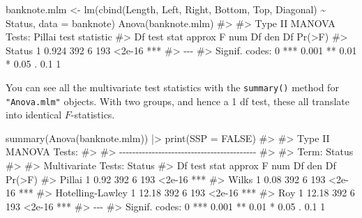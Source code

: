 \documentclass[
  letterpaper,
  10pt,
  krantz2]{krantz}
\makeatletter
\newenvironment{Shaded}{\begin{snugshade}}{\end{snugshade}}
\newcommand{\AttributeTok}[1]{\textcolor[rgb]{0.40,0.45,0.13}{#1}}
\newcommand{\CommentTok}[1]{\textcolor[rgb]{0.37,0.37,0.37}{#1}}
\newcommand{\ConstantTok}[1]{\textcolor[rgb]{0.56,0.35,0.01}{#1}}
\newcommand{\FunctionTok}[1]{\textcolor[rgb]{0.28,0.35,0.67}{#1}}
\newcommand{\NormalTok}[1]{\textcolor[rgb]{0.00,0.23,0.31}{#1}}
\newcommand{\OtherTok}[1]{\textcolor[rgb]{0.00,0.23,0.31}{#1}}
\newcommand{\SpecialCharTok}[1]{\textcolor[rgb]{0.37,0.37,0.37}{#1}}
\newenvironment{kframe}{%
  \medskip{}
  \setlength{\fboxsep}{.8em}
  \def\at@end@of@kframe{}%
  \ifinner\ifhmode%
  \def\at@end@of@kframe{\end{minipage}}%
  \begin{minipage}{\columnwidth}%
  \fi\fi%
  \def\FrameCommand##1{\hskip\@totalleftmargin \hskip-\fboxsep
  \colorbox{shadecolor}{##1}\hskip-\fboxsep
      \hskip-\linewidth \hskip-\@totalleftmargin \hskip\columnwidth}%
  \MakeFramed {\advance\hsize-\width
    \@totalleftmargin\z@ \linewidth\hsize
    \@setminipage}}%
{\par\unskip\endMakeFramed%
  \at@end@of@kframe}
\renewenvironment{Shaded}{\begin{kframe}}{\end{kframe}}
\makeatother
\begin{document}
\begin{Shaded}
\begin{Highlighting}[]
\NormalTok{banknote.mlm }\OtherTok{\textless{}{-}} \FunctionTok{lm}\NormalTok{(}\FunctionTok{cbind}\NormalTok{(Length, Left, Right, Bottom, Top, Diagonal) }\SpecialCharTok{\textasciitilde{}}\NormalTok{ Status,}
                    \AttributeTok{data =}\NormalTok{ banknote)}
\FunctionTok{Anova}\NormalTok{(banknote.mlm)}
\CommentTok{\#\textgreater{} }
\CommentTok{\#\textgreater{} Type II MANOVA Tests: Pillai test statistic}
\CommentTok{\#\textgreater{}        Df test stat approx F num Df den Df Pr(\textgreater{}F)    }
\CommentTok{\#\textgreater{} Status  1     0.924      392      6    193 \textless{}2e{-}16 ***}
\CommentTok{\#\textgreater{} {-}{-}{-}}
\CommentTok{\#\textgreater{} Signif. codes:  0 \textquotesingle{}***\textquotesingle{} 0.001 \textquotesingle{}**\textquotesingle{} 0.01 \textquotesingle{}*\textquotesingle{} 0.05 \textquotesingle{}.\textquotesingle{} 0.1 \textquotesingle{} \textquotesingle{} 1}
\end{Highlighting}
\end{Shaded}

You can see all the multivariate test statistics with the
\texttt{summary()} method for \texttt{"Anova.mlm"} objects. With two
groups, and hence a 1 df test, these all translate into identical
\(F\)-statistics.

\begin{Shaded}
\begin{Highlighting}[]
\FunctionTok{summary}\NormalTok{(}\FunctionTok{Anova}\NormalTok{(banknote.mlm)) }\SpecialCharTok{|\textgreater{}} \FunctionTok{print}\NormalTok{(}\AttributeTok{SSP =} \ConstantTok{FALSE}\NormalTok{)}
\CommentTok{\#\textgreater{} }
\CommentTok{\#\textgreater{} Type II MANOVA Tests:}
\CommentTok{\#\textgreater{} }
\CommentTok{\#\textgreater{} {-}{-}{-}{-}{-}{-}{-}{-}{-}{-}{-}{-}{-}{-}{-}{-}{-}{-}{-}{-}{-}{-}{-}{-}{-}{-}{-}{-}{-}{-}{-}{-}{-}{-}{-}{-}{-}{-}{-}{-}{-}{-}}
\CommentTok{\#\textgreater{}  }
\CommentTok{\#\textgreater{} Term: Status }
\CommentTok{\#\textgreater{} }
\CommentTok{\#\textgreater{} Multivariate Tests: Status}
\CommentTok{\#\textgreater{}                  Df test stat approx F num Df den Df Pr(\textgreater{}F)    }
\CommentTok{\#\textgreater{} Pillai            1      0.92      392      6    193 \textless{}2e{-}16 ***}
\CommentTok{\#\textgreater{} Wilks             1      0.08      392      6    193 \textless{}2e{-}16 ***}
\CommentTok{\#\textgreater{} Hotelling{-}Lawley  1     12.18      392      6    193 \textless{}2e{-}16 ***}
\CommentTok{\#\textgreater{} Roy               1     12.18      392      6    193 \textless{}2e{-}16 ***}
\CommentTok{\#\textgreater{} {-}{-}{-}}
\CommentTok{\#\textgreater{} Signif. codes:  0 \textquotesingle{}***\textquotesingle{} 0.001 \textquotesingle{}**\textquotesingle{} 0.01 \textquotesingle{}*\textquotesingle{} 0.05 \textquotesingle{}.\textquotesingle{} 0.1 \textquotesingle{} \textquotesingle{} 1}
\end{Highlighting}
\end{Shaded}
\end{document}

